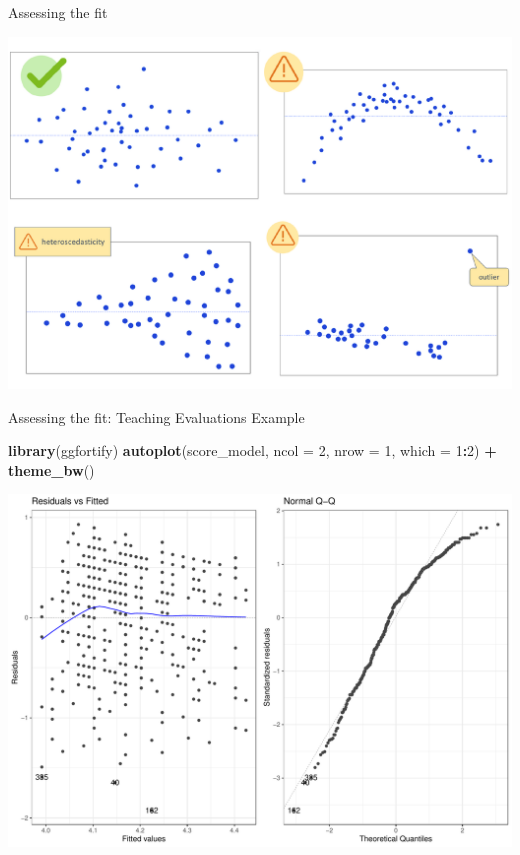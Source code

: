 \documentclass[
  ignorenonframetext,
]{beamer}
\newenvironment{Shaded}{\begin{snugshade}}{\end{snugshade}}
\newcommand{\AttributeTok}[1]{\textcolor[rgb]{0.13,0.29,0.53}{#1}}
\newcommand{\DecValTok}[1]{\textcolor[rgb]{0.00,0.00,0.81}{#1}}
\newcommand{\FunctionTok}[1]{\textcolor[rgb]{0.13,0.29,0.53}{\textbf{#1}}}
\newcommand{\NormalTok}[1]{#1}
\newcommand{\SpecialCharTok}[1]{\textcolor[rgb]{0.81,0.36,0.00}{\textbf{#1}}}
\begin{document}
\begin{frame}{Assessing the fit}
\protect\hypertarget{assessing-the-fit-1}{}
\begin{center}\includegraphics[width=0.9\linewidth]{Week4_Lect_files/figure-beamer/unnamed-chunk-25-1} \end{center}
\end{frame}

\begin{frame}[fragile]{Assessing the fit: Teaching Evaluations Example}
\protect\hypertarget{assessing-the-fit-teaching-evaluations-example}{}
\normalsize

\begin{Shaded}
\begin{Highlighting}[]
\FunctionTok{library}\NormalTok{(ggfortify)}
\FunctionTok{autoplot}\NormalTok{(score\_model, }\AttributeTok{ncol =} \DecValTok{2}\NormalTok{, }\AttributeTok{nrow =} \DecValTok{1}\NormalTok{, }\AttributeTok{which =} \DecValTok{1}\SpecialCharTok{:}\DecValTok{2}\NormalTok{) }\SpecialCharTok{+}
  \FunctionTok{theme\_bw}\NormalTok{()}
\end{Highlighting}
\end{Shaded}

\begin{center}\includegraphics[width=0.8\linewidth,height=0.5\textheight]{Week4_Lect_files/figure-beamer/unnamed-chunk-26-1} \end{center}
\normalsize
\end{frame}
\end{document}
